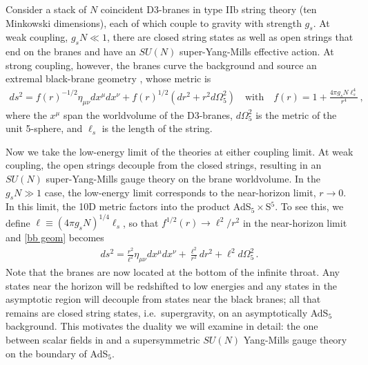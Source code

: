 \documentclass[../PhD.tex]{subfiles}
\begin{document}
Consider a stack of $N$ coincident D3-branes in type IIb string theory (ten Minkowski dimensions), each of which couple to gravity with strength $g_s$. At weak coupling, $g_s N \ll 1$, there are closed string states as well as open strings that end on the branes and have an $SU(N)$ super-Yang-Mills effective action. At strong coupling, however, the branes curve the background and source an extremal black-brane geometry \cite{Zwiebach:2004tj}, whose metric is
\begin{align}
\label{bb geom}
ds^2 = f(r)^{-1/2} \eta_{\mu \nu} dx^\mu dx^\nu + f(r)^{1/2} \left(  dr^2 + r^2 d\Omega_5^2 \right)  \quad  \text{with} \quad f(r) = 1 + \frac{4 \pi g_s N \ell_s^4}{r^4} \, ,
\end{align}
where the $x^\mu$ span the worldvolume of the D3-branes, $d\Omega_5^2$ is the metric of the unit 5-sphere, and $\ell_s$ is the length of the string.

Now we take the low-energy limit of the theories at either coupling limit. At weak coupling, the open strings decouple from the closed strings, resulting in an $SU(N)$ super-Yang-Mills gauge theory on the brane worldvolume. In the $g_s N \gg 1$ case, the low-energy limit corresponds to the near-horizon limit, $r \to 0$. In this limit, the 10D metric factors into the product AdS$_5 \times$S$^5$. To see this, we define $\ell \equiv (4\pi g_s N)^{1/4} \ell_s$, so that $f^{1/2}(r) \to \ell^2 / r^2$ in the near-horizon limit and \eqref{bb geom} becomes
\begin{align}
\label{param rels}
ds^2 = \frac{r^2}{\ell^2} \eta_{\mu \nu} dx^\mu dx^\nu + \frac{\ell^2}{r^2}dr^2 + \ell^2 d\Omega_5^2 \, .
\end{align}
Note that the branes are now located at the bottom of the infinite throat. Any states near the horizon will be redshifted to low energies and any states in the asymptotic region will decouple from states near the black branes; all that remains are closed string states, i.e.~supergravity, on an asymptotically AdS$_5$ background. This motivates the duality we will examine in detail: the one between scalar fields in \ads and a supersymmetric $SU(N)$ Yang-Mills gauge theory on the boundary of AdS$_5$.
\end{document}
